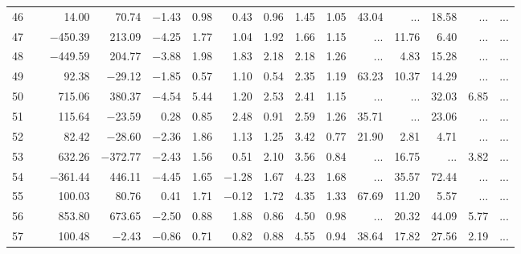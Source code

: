 \begin{table*}[p]
{\begin{tabular}{l@{ }r@{ \ }rr@{ \ }rr@{ \ }rrrr@{ \ }r@{ \ }r@{ \ }r@{ \ }r}
 46   \ \dotfill \  &     14.00 &     70.74 &  $-$1.43 &   0.98 &    0.43 &   0.96&    1.45 &   1.05&       43.04 &    ...     &       18.58 &    ...     &    ...       \\     
 47   \ \dotfill \  &  $-$450.39 &    213.09 &  $-$4.25 &   1.77 &    1.04 &   1.92&    1.66 &   1.15&    ...     &       11.76 &        6.40 &    ...     &    ...       \\     
 48   \ \dotfill \  &  $-$449.59 &    204.77 &  $-$3.88 &   1.98 &    1.83 &   2.18&    2.18 &   1.26&    ...     &        4.83 &       15.28 &    ...     &    ...       \\     
 49   \ \dotfill \  &     92.38 &   $-$29.12 &  $-$1.85 &   0.57 &    1.10 &   0.54&    2.35 &   1.19&       63.23 &       10.37 &       14.29 &    ...     &    ...       \\     
 50   \ \dotfill \  &    715.06 &    380.37 &  $-$4.54 &   5.44 &    1.20 &   2.53&    2.41 &   1.15&    ...     &    ...     &       32.03 &        6.85 &    ...       \\     
 51   \ \dotfill \  &    115.64 &   $-$23.59 &    0.28 &   0.85 &    2.48 &   0.91&    2.59 &   1.26&       35.71 &    ...     &       23.06 &    ...     &    ...       \\     
 52   \ \dotfill \  &     82.42 &   $-$28.60 &  $-$2.36 &   1.86 &    1.13 &   1.25&    3.42 &   0.77&       21.90 &        2.81 &        4.71 &    ...     &    ...       \\     
 53   \ \dotfill \  &    632.26 &  $-$372.77 &  $-$2.43 &   1.56 &    0.51 &   2.10&    3.56 &   0.84&    ...     &       16.75 &    ...     &        3.82 &    ...       \\     
 54   \ \dotfill \  &  $-$361.44 &    446.11 &  $-$4.45 &   1.65 &  $-$1.28 &   1.67&    4.23 &   1.68&    ...     &       35.57 &       72.44 &    ...     &    ...       \\     
 55   \ \dotfill \  &    100.03 &     80.76 &    0.41 &   1.71 &  $-$0.12 &   1.72&    4.35 &   1.33&       67.69 &       11.20 &        5.57 &    ...     &    ...       \\     
 56   \ \dotfill \  &    853.80 &    673.65 &  $-$2.50 &   0.88 &    1.88 &   0.86&    4.50 &   0.98&    ...     &       20.32 &       44.09 &        5.77 &    ...       \\     
 57   \ \dotfill \  &    100.48 &    $-$2.43 &  $-$0.86 &   0.71 &    0.82 &   0.88&    4.55 &   0.94&       38.64 &       17.82 &       27.56 &        2.19 &    ...       \\     

\end{tabular}}
\end{table*}
